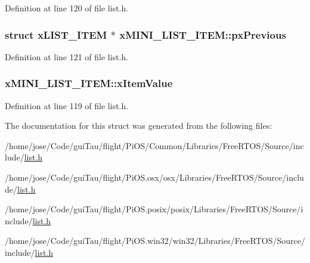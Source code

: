 Definition at line 120 of file list.\-h.

\hypertarget{structx_m_i_n_i___l_i_s_t___i_t_e_m_a4d65b08ff0a93fd38b6e3e372065ccd9}{
\subsubsection[{px\-Previous}]{\setlength{\rightskip}{0pt plus 5cm}struct {\bf x\-L\-I\-S\-T\-\_\-\-I\-T\-E\-M} $\ast$ x\-M\-I\-N\-I\-\_\-\-L\-I\-S\-T\-\_\-\-I\-T\-E\-M\-::px\-Previous}}\label{structx_m_i_n_i___l_i_s_t___i_t_e_m_a4d65b08ff0a93fd38b6e3e372065ccd9}


Definition at line 121 of file list.\-h.

\hypertarget{structx_m_i_n_i___l_i_s_t___i_t_e_m_a368416ac432b0b4596bd64acfa095b19}{
\subsubsection[{x\-Item\-Value}]{ x\-M\-I\-N\-I\-\_\-\-L\-I\-S\-T\-\_\-\-I\-T\-E\-M\-::x\-Item\-Value}}\label{structx_m_i_n_i___l_i_s_t___i_t_e_m_a368416ac432b0b4596bd64acfa095b19}


Definition at line 119 of file list.\-h.



The documentation for this struct was generated from the following files\-:\begin{DoxyCompactItemize}
\item 
/home/jose/\-Code/gui\-Tau/flight/\-Pi\-O\-S/\-Common/\-Libraries/\-Free\-R\-T\-O\-S/\-Source/include/\hyperlink{_common_2_libraries_2_free_r_t_o_s_2_source_2include_2list_8h}{list.\-h}\item 
/home/jose/\-Code/gui\-Tau/flight/\-Pi\-O\-S.\-osx/osx/\-Libraries/\-Free\-R\-T\-O\-S/\-Source/include/\hyperlink{osx_2osx_2_libraries_2_free_r_t_o_s_2_source_2include_2list_8h}{list.\-h}\item 
/home/jose/\-Code/gui\-Tau/flight/\-Pi\-O\-S.\-posix/posix/\-Libraries/\-Free\-R\-T\-O\-S/\-Source/include/\hyperlink{posix_2posix_2_libraries_2_free_r_t_o_s_2_source_2include_2list_8h}{list.\-h}\item 
/home/jose/\-Code/gui\-Tau/flight/\-Pi\-O\-S.\-win32/win32/\-Libraries/\-Free\-R\-T\-O\-S/\-Source/include/\hyperlink{win32_2win32_2_libraries_2_free_r_t_o_s_2_source_2include_2list_8h}{list.\-h}\end{DoxyCompactItemize}
